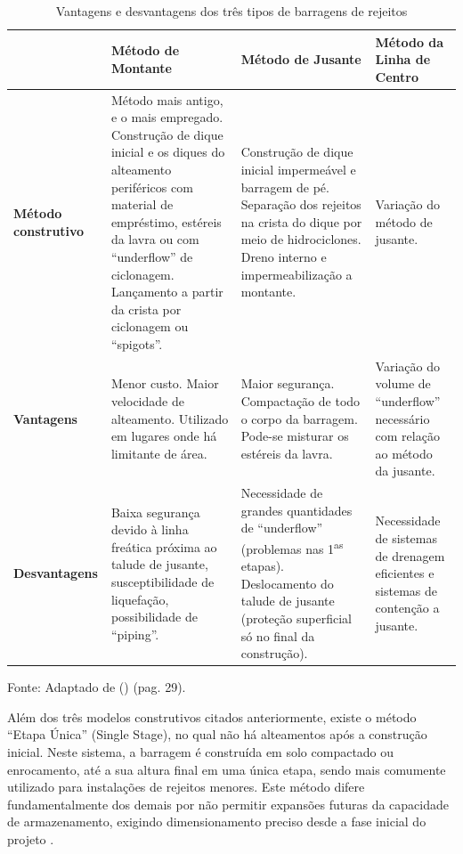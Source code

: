 \begin{table}[h!]
    \centering
    \caption{Vantagens e desvantagens dos três tipos de barragens de rejeitos}
    \label{tab:vantagens_desvantagens}
    \begin{tabular}{|p{2.3cm}|p{3.8cm}|p{3.8cm}|p{3.8cm}|}
        \hline
         & 
        \textbf{Método de Montante} & 
        \textbf{Método de Jusante} & 
        \textbf{Método da Linha de Centro} \\
        \hline
        \textbf{Método construtivo} & 
        Método mais antigo, e o mais empregado. Construção de dique inicial e os diques do alteamento periféricos com material de empréstimo, estéreis da lavra ou com ``underflow'' de ciclonagem. Lançamento a partir da crista por ciclonagem ou ``spigots''. & 
        Construção de dique inicial impermeável e barragem de pé. Separação dos rejeitos na crista do dique por meio de hidrociclones. Dreno interno e impermeabilização a montante. & 
        Variação do método de jusante. \\
        \hline
        \textbf{Vantagens} & 
        Menor custo. Maior velocidade de alteamento. Utilizado em lugares onde há limitante de área. & 
        Maior segurança. Compactação de todo o corpo da barragem. Pode-se misturar os estéreis da lavra. & 
        Variação do volume de ``underflow'' necessário com relação ao método da jusante. \\
        \hline
        \textbf{Desvantagens} & 
        Baixa segurança devido à linha freática próxima ao talude de jusante, susceptibilidade de liquefação, possibilidade de ``piping''. & 
        Necessidade de grandes quantidades de ``underflow'' (problemas nas 1\textsuperscript{as} etapas). Deslocamento do talude de jusante (proteção superficial só no final da construção). & 
        Necessidade de sistemas de drenagem eficientes e sistemas de contenção a jusante. \\
        \hline
    \end{tabular}
    \footnotesize
    Fonte: Adaptado de \citeauthor{lozano2006} (\citeyear{lozano2006}) (pag. 29).
\end{table}


Além dos três modelos construtivos citados anteriormente, existe o método ``Etapa Única'' (Single Stage), no qual não há alteamentos após a construção inicial. Neste sistema, a barragem é construída em solo compactado ou enrocamento, até a sua altura final em uma única etapa, sendo mais comumente utilizado para instalações de rejeitos menores. Este método difere fundamentalmente dos demais por não permitir expansões futuras da capacidade de armazenamento, exigindo dimensionamento preciso desde a fase inicial do projeto \cite{vale2024, teck2019}.

